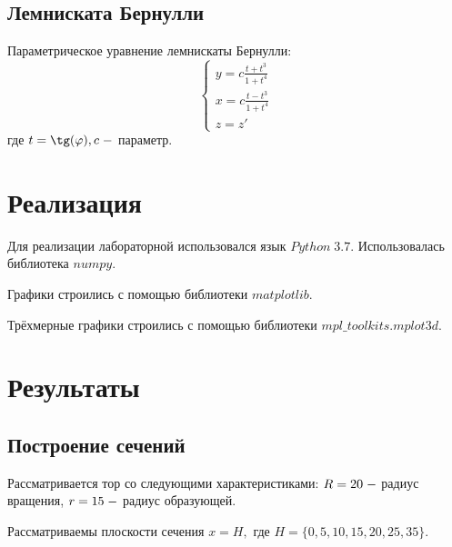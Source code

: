 \documentclass[a4]{article}
\begin{document}
\subsection{Лемниската Бернулли}
Параметрическое уравнение лемнискаты Бернулли: \hfill\cite{source}
\begin{equation}
    \begin{cases}
    y=c\frac{t+t^3}{1+t^4}\\
    x=c\frac{t-t^3}{1+t^4}\\
    z=z'
    \end{cases}
\end{equation}
где $t=\tg(\varphi), c\;\--$ параметр.

\section{Реализация}
Для реализации лабораторной использовался язык $Python\;3.7$. Использовалась библиотека $numpy.$\hfill\cite{numpy} 

Графики строились с помощью библиотеки $matplotlib.$ \hfill\cite{plotlib}

Трёхмерные графики строились с помощью библиотеки $mpl\_toolkits.mplot3d.$\hfill \cite{plot3}


\newpage
\section{Результаты}
\subsection{Построение сечений}
Рассматривается тор со следующими характеристиками: $R=20\;\--$ радиус вращения, $r=15\;\--$ радиус образующей.

Рассматриваемы плоскости сечения $x = H,$ где $H=\{0, 5, 10, 15, 20, 25, 35\}.$
\end{document}
